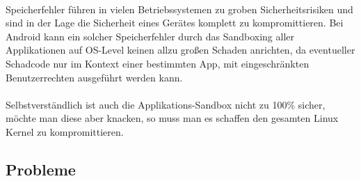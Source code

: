 \paragraph*{}
Speicherfehler führen in vielen Betriebssystemen zu groben Sicherheitsrisiken und sind in der Lage die Sicherheit eines Gerätes komplett zu kompromittieren. Bei Android kann ein solcher Speicherfehler durch das Sandboxing aller Applikationen auf OS-Level keinen allzu großen Schaden anrichten, da eventueller Schadcode nur im Kontext einer bestimmten App, mit eingeschränkten Benutzerrechten ausgeführt werden kann.
\paragraph*{}
Selbstverständlich ist auch die Applikations-Sandbox nicht zu 100\% sicher, möchte man diese aber knacken, so muss man es schaffen den gesamten Linux Kernel zu kompromittieren.
	
\subsection{Probleme}
